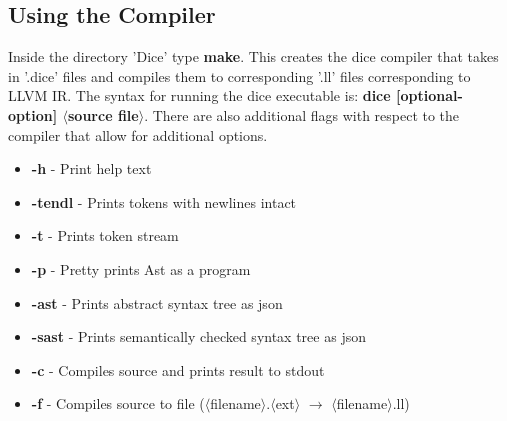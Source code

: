 \begin{homeworkProblem}
	\section{Using the Compiler}
	Inside the directory 'Dice' type \textbf{make}. This creates the dice compiler that takes in '.dice' files and compiles them to corresponding '.ll' files corresponding to LLVM IR. The syntax for running the dice executable is: \textbf{dice [optional-option] $\langle$source file$\rangle$}. There are also additional flags with respect to the compiler that allow for additional options.
	\begin{itemize}
		\item \textbf{-h} - Print help text
		\item \textbf{-tendl} - Prints tokens with newlines intact
		\item \textbf{-t} - Prints token stream
		\item \textbf{-p} - Pretty prints Ast as a program
		\item \textbf{-ast} - Prints abstract syntax tree as json
		\item \textbf{-sast} - Prints semantically checked syntax tree as json
		\item \textbf{-c} - Compiles source and prints result to stdout
		\item \textbf{-f} - Compiles source to file ($\langle$filename$\rangle$.$\langle$ext$\rangle$ $\rightarrow$ $\langle$filename$\rangle$.ll)
	\end{itemize}
	

\end{homeworkProblem}
